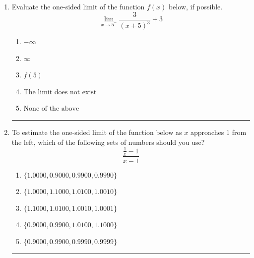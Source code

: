 \documentclass[14pt]{extbook}
\newcommand{\litem}[1]{\item#1\hspace*{-1cm}\rule{\textwidth}{0.4pt}}
\begin{document}
\begin{enumerate}
{\begin{enumerate}[label=\Alph*.]
\end{enumerate} }
\litem{
Evaluate the one-sided limit of the function $f(x)$ below, if possible.\[ \lim_{x \rightarrow 5^-} \frac{3}{(x+5)^3}+3 \]\begin{enumerate}[label=\Alph*.]
\item \( -\infty \)
\item \( \infty \)
\item \( f(5) \)
\item \( \text{The limit does not exist} \)
\item \( \text{None of the above} \)

\end{enumerate} }
\litem{
To estimate the one-sided limit of the function below as $x$ approaches 1 from the left, which of the following sets of numbers should you use?\[ \frac{\frac{1}{x} - 1}{x - 1} \]\begin{enumerate}[label=\Alph*.]
\item \( \{ 1.0000, 0.9000, 0.9900, 0.9990 \} \)
\item \( \{ 1.0000, 1.1000, 1.0100, 1.0010 \} \)
\item \( \{ 1.1000, 1.0100, 1.0010, 1.0001 \} \)
\item \( \{ 0.9000, 0.9900, 1.0100, 1.1000 \} \)
\item \( \{ 0.9000, 0.9900, 0.9990, 0.9999 \} \)

\end{enumerate} }
\end{enumerate}
\end{document}
